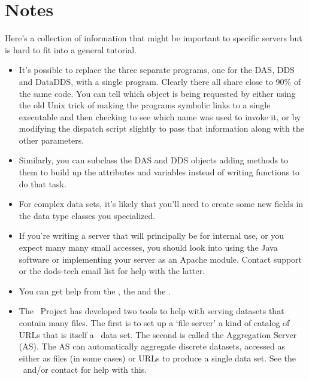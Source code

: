 \documentclass{dods-paper}
\begin{document}
\section{Notes}

Here's a collection of information that might be important to specific
servers but is hard to fit into a general tutorial.

\begin{itemize}

\item It's possible to replace the three separate programs, one for the DAS,
  DDS and DataDDS, with a single program. Clearly there all share close to
  90\% of the same code. You can tell which object is being requested by
  either using the old Unix trick of making the programs symbolic links to a
  single executable and then checking to see which name was used to invoke
  it, or by modifying the dispatch script slightly to pass that information
  along with the other parameters.

\item Similarly, you can subclass the DAS and DDS objects adding methods to
  them to build up the attributes and variables instead of writing functions
  to do that task. 

\item For complex data sets, it's likely that you'll need to create some new
  fields in the data type classes you specialized.

\item If you're writing a server that will principally be for internal use, or
  you expect many many small accesses, you should look into using the Java
  software or implementing your server as an Apache module. Contact support
  or the dods-tech email list for help with the latter.
  
\item You can get help from the \OPDhome, the 
  and the .
  
\item The \opendap\ Project has developed two tools to help with serving
  datasets that contain many files. The first is to set up a `file server' a
  kind of catalog of URLs that is itself a \opendap\ data set. The second is
  called the Aggregation Server (AS). The AS can automatically aggregate
  discrete datasets, accessed as either as files (in some cases) or URLs to
  produce a single data set. See the \OPDhome\ and/or contact  for help with this.


\end{itemize}
\end{document}
